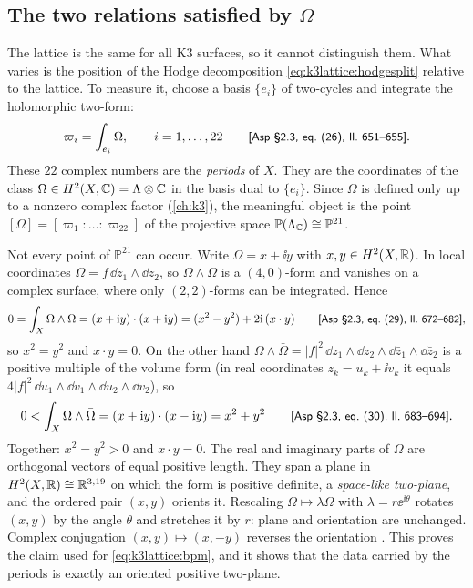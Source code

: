 \subsection{The two relations satisfied by \texorpdfstring{$\Omega$}{Omega}}
The lattice is the same for all K3 surfaces, so it cannot distinguish them. What varies is
the position of the Hodge decomposition \eqref{eq:k3lattice:hodgesplit} relative to the
lattice. To measure it, choose a basis $\{e_i\}$ of two-cycles and integrate the holomorphic
two-form:
\begin{equation}\label{eq:k3lattice:periods}
 \varpi_i=\int_{e_i}\Omega ,\qquad i=1,\dots,22
 \qquad\text{{\small\textsf{[Asp §2.3, eq.~(26), ll.~651--655]}}} .
\end{equation}
These $22$ complex numbers are the \emph{periods} of $X$. They are the
coordinates of the class $\Omega\in H^2(X,\mathbb{C})=\Lambda\otimes\mathbb{C}$ in the basis dual to
$\{e_i\}$. Since $\Omega$ is defined only up to a nonzero complex factor (\cref{ch:k3}), the
meaningful object is the point $[\Omega]=[\varpi_1:\dots:\varpi_{22}]$ of the projective
space $\mathbb{P}(\Lambda_{\mathbb{C}})\cong\mathbb{P}^{21}$.

Not every point of $\mathbb{P}^{21}$ can occur. Write $\Omega=x+\ii y$ with
$x,y\in H^2(X,\mathbb{R})$. In local coordinates $\Omega=f\,\dd z_1\wedge\dd z_2$, so
$\Omega\wedge\Omega$ is a $(4,0)$-form and vanishes on a complex surface, where only
$(2,2)$-forms can be integrated. Hence
\begin{equation}\label{eq:k3lattice:OmegaOmega}
 0=\int_X\Omega\wedge\Omega=(x+\mathrm{i} y)\cdot(x+\mathrm{i} y)=(x^2-y^2)+2\mathrm{i}\,(x\cdot y)
 \qquad\text{{\small\textsf{[Asp §2.3, eq.~(29), ll.~672--682]}}} ,
\end{equation}
so $x^2=y^2$ and $x\cdot y=0$. On the other hand $\Omega\wedge\bar\Omega
=|f|^2\,\dd z_1\wedge\dd z_2\wedge\dd\bar z_1\wedge\dd\bar z_2$ is a positive multiple of the
volume form (in real coordinates $z_k=u_k+\ii v_k$ it equals
$4|f|^2\,\dd u_1\wedge\dd v_1\wedge\dd u_2\wedge\dd v_2$), so
\begin{equation}\label{eq:k3lattice:OmegaOmegabar}
 0<\int_X\Omega\wedge\bar\Omega=(x+\mathrm{i} y)\cdot(x-\mathrm{i} y)=x^2+y^2
 \qquad\text{{\small\textsf{[Asp §2.3, eq.~(30), ll.~683--694]}}} .
\end{equation}
Together: $x^2=y^2>0$ and $x\cdot y=0$. The real and imaginary parts of $\Omega$ are
orthogonal vectors of equal positive length. They span a plane in $H^2(X,\mathbb{R})\cong\mathbb{R}^{3,19}$
on which the form is positive definite, a \emph{space-like two-plane}, and the ordered pair
$(x,y)$ orients it. Rescaling $\Omega\mapsto\lambda\Omega$ with $\lambda=r\ee^{\ii\theta}$
rotates $(x,y)$ by the angle $\theta$ and stretches it by $r$: plane and orientation are
unchanged. Complex conjugation $(x,y)\mapsto(x,-y)$ reverses the orientation
. This proves the claim used for
\eqref{eq:k3lattice:bpm}, and it shows that the data carried by the periods is exactly an
oriented positive two-plane.

